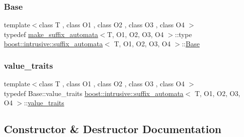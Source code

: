 \subsubsection{\texorpdfstring{Base}{Base}}
{\footnotesize\ttfamily template$<$class T , class O1 , class O2 , class O3 , class O4 $>$ \\
typedef \hyperlink{structboost_1_1intrusive_1_1make__suffix__automata}{make\+\_\+suffix\+\_\+automata}$<$T, O1, O2, O3, O4 $>$\+::type \hyperlink{classboost_1_1intrusive_1_1suffix__automata}{boost\+::intrusive\+::suffix\+\_\+automata}$<$ T, O1, O2, O3, O4 $>$\+::\hyperlink{classboost_1_1intrusive_1_1suffix__automata_af5152d681de2ae59737825d5b2c2b027}{Base}}

\mbox{\label{classboost_1_1intrusive_1_1suffix__automata_a159d8fbab457d5f8aae6ebb5a98b18c2}} 
\subsubsection{\texorpdfstring{value\+\_\+traits}{value\_traits}}
{\footnotesize\ttfamily template$<$class T , class O1 , class O2 , class O3 , class O4 $>$ \\
typedef Base\+::value\+\_\+traits \hyperlink{classboost_1_1intrusive_1_1suffix__automata}{boost\+::intrusive\+::suffix\+\_\+automata}$<$ T, O1, O2, O3, O4 $>$\+::\hyperlink{classboost_1_1intrusive_1_1suffix__automata_a159d8fbab457d5f8aae6ebb5a98b18c2}{value\+\_\+traits}}



\subsection{Constructor \& Destructor Documentation}
\mbox{\label{classboost_1_1intrusive_1_1suffix__automata_a671eee511bab2df95ef036be104dcefa}} 
